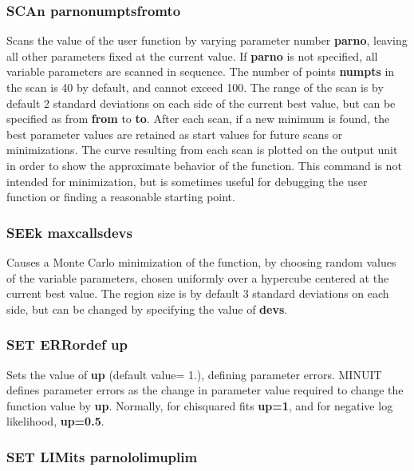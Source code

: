 \subsubsection*{SCAn \lsb parno\rsb   \lsb numpts\rsb  \lsb from\rsb   \lsb to\rsb }

Scans the value of the user function by varying parameter number
{\bf \lsb parno\rsb }, leaving all other parameters fixed at the current value.
If {\bf \lsb parno\rsb } is not specified, all variable parameters are scanned in
sequence. The number of points {\bf \lsb numpts\rsb } in the scan is 40 by default,
and cannot exceed 100.
The range of the scan is by default 2 standard deviations on each side
of the current best value, but can be specified as from
{\bf \lsb from\rsb } to {\bf \lsb to\rsb }.
After each scan, if a new minimum is found, the best parameter values
are retained as start values for future scans or minimizations.
The curve resulting from each scan is plotted on the output unit
in order to show the approximate behavior of the function.
This command is not intended for minimization, but is sometimes useful
for debugging the user function or finding a reasonable starting point.

\subsubsection*{SEEk  \lsb maxcalls\rsb   \lsb devs\rsb }

Causes a Monte Carlo minimization of the function, by choosing
random values of the variable parameters, chosen uniformly over a
hypercube centered at the current best value.  The region size is by
default 3 standard deviations on each side, but can be changed by
specifying the value of {\bf \lsb devs\rsb }.

\subsubsection*{SET ERRordef  up}

Sets the value of {\bf up} (default value= 1.), defining parameter errors.
MINUIT defines parameter errors as the change in parameter value
required to change the function value by {\bf up}.
Normally, for chisquared fits {\bf up=1},
and for negative log likelihood, {\bf up=0.5}.

\subsubsection*{SET LIMits  \lsb parno\rsb   \lsb lolim\rsb   \lsb uplim\rsb }

